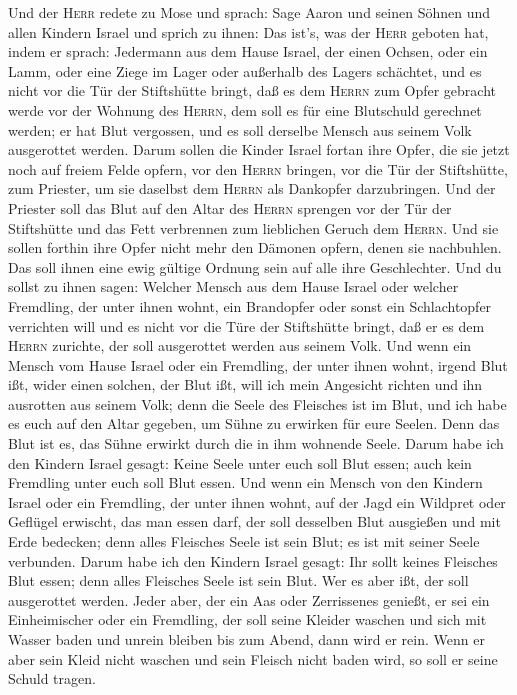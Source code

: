  Und der \textsc{Herr} redete zu Mose und sprach:
 Sage Aaron und seinen Söhnen und allen Kindern Israel und
sprich zu ihnen: Das ist's, was der \textsc{Herr} geboten hat, indem er
sprach:  Jedermann aus dem Hause Israel, der einen Ochsen,
oder ein Lamm, oder eine Ziege im Lager oder außerhalb des Lagers
schächtet,  und es nicht vor die Tür der Stiftshütte
bringt, daß es dem \textsc{Herrn} zum Opfer gebracht werde vor der
Wohnung des \textsc{Herrn}, dem soll es für eine Blutschuld gerechnet
werden; er hat Blut vergossen, und es soll derselbe Mensch aus seinem
Volk ausgerottet werden.  Darum sollen die Kinder Israel
fortan ihre Opfer, die sie jetzt noch auf freiem Felde opfern, vor den
\textsc{Herrn} bringen, vor die Tür der Stiftshütte, zum Priester, um
sie daselbst dem \textsc{Herrn} als Dankopfer darzubringen.
 Und der Priester soll das Blut auf den Altar des
\textsc{Herrn} sprengen vor der Tür der Stiftshütte und das Fett
verbrennen zum lieblichen Geruch dem \textsc{Herrn}.  Und
sie sollen forthin ihre Opfer nicht mehr den Dämonen opfern, denen sie
nachbuhlen. Das soll ihnen eine ewig gültige Ordnung sein auf alle ihre
Geschlechter.  Und du sollst zu ihnen sagen: Welcher
Mensch aus dem Hause Israel oder welcher Fremdling, der unter ihnen
wohnt, ein Brandopfer oder sonst ein Schlachtopfer verrichten will
 und es nicht vor die Türe der Stiftshütte bringt, daß er
es dem \textsc{Herrn} zurichte, der soll ausgerottet werden aus seinem
Volk.  Und wenn ein Mensch vom Hause Israel oder ein
Fremdling, der unter ihnen wohnt, irgend Blut ißt, wider einen solchen,
der Blut ißt, will ich mein Angesicht richten und ihn ausrotten aus
seinem Volk;  denn die Seele des Fleisches ist im Blut,
und ich habe es euch auf den Altar gegeben, um Sühne zu erwirken für
eure Seelen. Denn das Blut ist es, das Sühne erwirkt durch die in ihm
wohnende Seele.  Darum habe ich den Kindern Israel
gesagt: Keine Seele unter euch soll Blut essen; auch kein Fremdling
unter euch soll Blut essen.  Und wenn ein Mensch von den
Kindern Israel oder ein Fremdling, der unter ihnen wohnt, auf der Jagd
ein Wildpret oder Geflügel erwischt, das man essen darf, der soll
desselben Blut ausgießen und mit Erde bedecken;  denn
alles Fleisches Seele ist sein Blut; es ist mit seiner Seele verbunden.
Darum habe ich den Kindern Israel gesagt: Ihr sollt keines Fleisches
Blut essen; denn alles Fleisches Seele ist sein Blut. Wer es aber ißt,
der soll ausgerottet werden.  Jeder aber, der ein Aas
oder Zerrissenes genießt, er sei ein Einheimischer oder ein Fremdling,
der soll seine Kleider waschen und sich mit Wasser baden und unrein
bleiben bis zum Abend, dann wird er rein.  Wenn er aber
sein Kleid nicht waschen und sein Fleisch nicht baden wird, so soll er
seine Schuld tragen.

